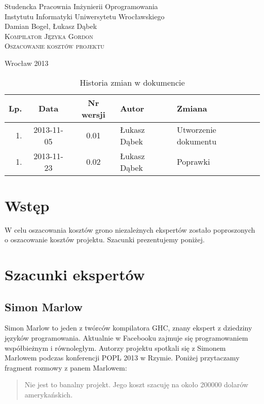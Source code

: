 \documentclass{documentation}
\begin{document}
\begin{titlepage}
\begin{center}
Studencka Pracownia Inżynierii Oprogramowania\\
Instytutu Informatyki Uniwersytetu Wrocławskiego\\[6cm]

Damian Bogel, Łukasz Dąbek\\[1cm]
\textsc{\LARGE Kompilator Języka Gordon}\\[0.5cm]
\textsc{\large Oszacowanie kosztów projektu}

\vfill
Wrocław 2013 \\[2.5cm]

\end{center}
\end{titlepage}

\newpage
\begin{table}
	\centering
	\caption{Historia zmian w dokumencie}
		\begin{tabular}{|r|c|c|l|l|}
		\hline
		Lp.  & Data       & Nr wersji & Autor                 & Zmiana \\ \hline
		1.   & 2013-11-05 & 0.01 & Łukasz Dąbek & Utworzenie dokumentu \\ \hline
		1.   & 2013-11-23 & 0.02 & Łukasz Dąbek & Poprawki             \\ \hline
	\end{tabular}
\end{table}
\newpage

\tableofcontents
\setcounter{page}{2}

\newpage

\section{Wstęp}
\noindent W celu oszacowania kosztów grono niezależnych ekspertów zostało poproszonych
o oszacowanie kosztów projektu. Szacunki prezentujemy poniżej.

\section{Szacunki ekspertów}
\subsection{Simon Marlow}
\noindent Simon Marlow to jeden z twórców kompilatora \textsc{GHC}, znany ekspert
z dziedziny języków programowania. Aktualnie w Facebooku zajmuje się programowaniem
współbieżnym i równoległym. Autorzy projektu spotkali się z Simonem Marlowem podczas
konferencji POPL 2013 w Rzymie. Poniżej przytaczamy fragment rozmowy z panem Marlowem:
\begin{quotation}
    Nie jest to banalny projekt. Jego koszt szacuję na około 200000 dolarów amerykańskich.
\end{quotation}
\end{document}
